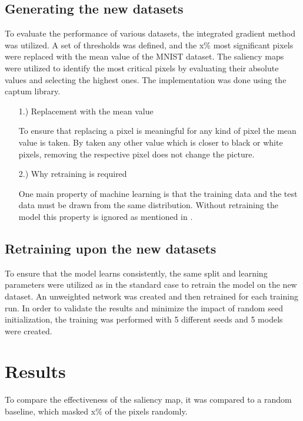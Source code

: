 \documentclass[conference]{IEEEtran}
\begin{document}
\subsection{Generating the new datasets}
To evaluate the performance of various datasets, the integrated gradient method was utilized. A set of thresholds was defined, and the x\% most significant pixels were replaced with the mean value of the MNIST dataset. The saliency maps were utilized to identify the most critical pixels by evaluating their absolute values and selecting the highest ones. The implementation was done using the captum library.

\begin{enumerate}
	    \item[1.)] Replacement with the mean value
	
	To ensure that replacing a pixel is meaningful for any kind of pixel the mean value is taken. By taken any other value which is closer to black or white pixels, removing the respective pixel does not change the picture.
	
		\item[2.)] Why retraining is required
	
	One main property of machine learning is that the training data and the test data must be drawn from the same distribution. Without retraining the model this property is ignored as mentioned in \cite{RoaR}.
	
\end{enumerate}

\subsection{Retraining upon the new datasets}

To ensure that the model learns consistently, the same split and learning parameters were utilized as in the standard case to retrain the model on the new dataset. An unweighted network was created and then retrained for each training run. In order to validate the results and minimize the impact of random seed initialization, the training was performed with 5 different seeds and 5 models were created.

\section{Results}

To compare the effectiveness of the saliency map, it was compared to a random baseline, which masked x\% of the pixels randomly.
\end{document}

